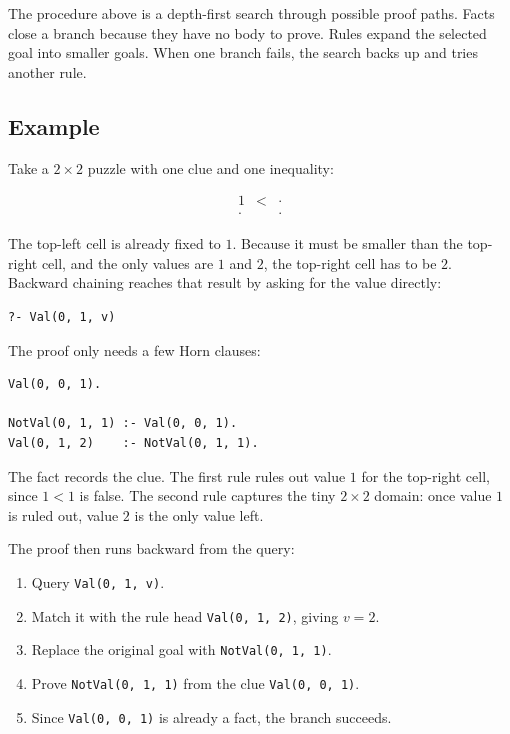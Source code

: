 The procedure above is a depth-first search through possible proof paths.
Facts close a branch because they have no body to prove.
Rules expand the selected goal into smaller goals.
When one branch fails, the search backs up and tries another rule.

\subsection{Example}

Take a $2 \times 2$ puzzle with one clue and one inequality:

\[
\begin{array}{ccc}
1 & < & \cdot \\
\cdot &   & \cdot
\end{array}
\]

The top-left cell is already fixed to $1$.
Because it must be smaller than the top-right cell, and the only values are
$1$ and $2$, the top-right cell has to be $2$.
Backward chaining reaches that result by asking for the value directly:

\begin{verbatim}
?- Val(0, 1, v)
\end{verbatim}

The proof only needs a few Horn clauses:

\begin{verbatim}
Val(0, 0, 1).

NotVal(0, 1, 1) :- Val(0, 0, 1).
Val(0, 1, 2)    :- NotVal(0, 1, 1).
\end{verbatim}

The fact records the clue.
The first rule rules out value $1$ for the top-right cell, since $1 < 1$ is
false.
The second rule captures the tiny $2 \times 2$ domain: once value $1$ is ruled
out, value $2$ is the only value left.

The proof then runs backward from the query:

\begin{enumerate}
  \item Query \texttt{Val(0, 1, v)}.
  \item Match it with the rule head \texttt{Val(0, 1, 2)}, giving $v = 2$.
  \item Replace the original goal with \texttt{NotVal(0, 1, 1)}.
  \item Prove \texttt{NotVal(0, 1, 1)} from the clue \texttt{Val(0, 0, 1)}.
  \item Since \texttt{Val(0, 0, 1)} is already a fact, the branch succeeds.
\end{enumerate}

